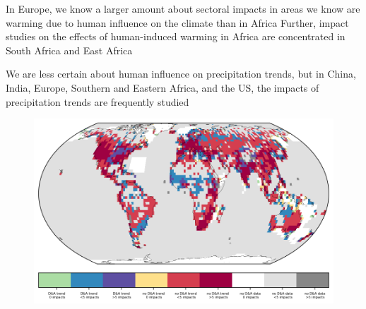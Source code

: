 \documentclass[9pt]{beamer}
\begin{document}
\begin{frame}{In Europe, we know a larger amount about sectoral impacts in areas we know are warming due to human influence on the climate than in Africa}
Further, impact studies on the effects of human-induced warming in Africa are concentrated in South Africa and East Africa

\end{frame}


\begin{frame}{We are less certain about human influence on precipitation trends, but in China, India, Europe, Southern and Eastern Africa, and the US, the impacts of precipitation trends are frequently studied }

\begin{figure}
	\includegraphics[width=\linewidth]{../plots/maps/gridcells_da_studies_precip_2_5_global.png}
\end{figure}

\end{frame}
\end{document}
